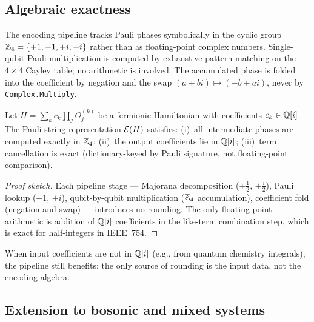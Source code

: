 %

\subsection{Algebraic exactness}
\label{sec:further-exactness}

The encoding pipeline tracks Pauli phases symbolically in the cyclic
group $\mathbb{Z}_4 = \{+1, -1, +i, -i\}$ rather than as floating-point complex
numbers.  Single-qubit Pauli multiplication is computed by exhaustive
pattern matching on the $4 \times 4$ Cayley table; no arithmetic is
involved.  The accumulated phase is folded into the coefficient by
negation and the swap $(a + bi) \mapsto (-b + ai)$, never by
\texttt{Complex.Multiply}.

\begin{theorem}
\label{thm:exactness}
Let $H = \sum_k c_k \prod_j O_j^{(k)}$ be a fermionic Hamiltonian
with coefficients $c_k \in \mathbb{Q}[i]$.  The Pauli-string representation
$\mathcal{E}(H)$ satisfies: (i)~all intermediate phases are computed
exactly in $\mathbb{Z}_4$; (ii)~the output coefficients lie in $\mathbb{Q}[i]$;
(iii)~term cancellation is exact (dictionary-keyed by Pauli
signature, not floating-point comparison).
\end{theorem}

\begin{proof}[Proof sketch]
Each pipeline stage — Majorana decomposition ($\pm\frac{1}{2}$,
$\pm\frac{i}{2}$), Pauli lookup ($\pm 1$, $\pm i$), qubit-by-qubit
multiplication ($\mathbb{Z}_4$ accumulation), coefficient fold (negation and
swap) — introduces no rounding.  The only floating-point arithmetic
is addition of $\mathbb{Q}[i]$ coefficients in the like-term combination step,
which is exact for half-integers in IEEE~754.
\end{proof}

When input coefficients are not in $\mathbb{Q}[i]$ (e.g., from quantum chemistry
integrals), the pipeline still benefits: the only source of rounding is
the input data, not the encoding algebra.

\subsection{Extension to bosonic and mixed systems}
\label{sec:further-bosonic}

